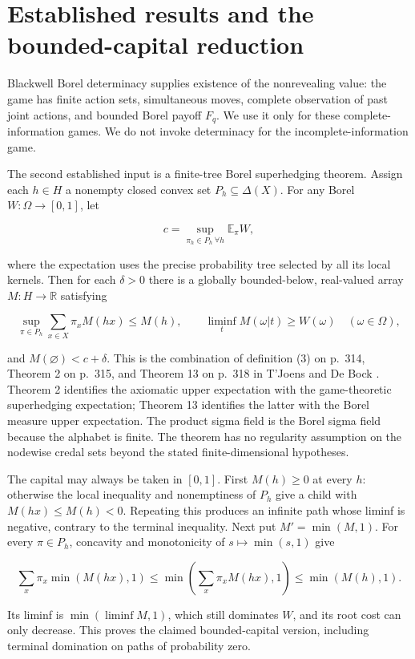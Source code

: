 \documentclass[11pt,a4paper]{article}
\begin{document}
\section{Established results and the bounded-capital reduction}

Blackwell Borel determinacy \cite[Theorem 10, p.~1578]{Martin} supplies existence of the nonrevealing value: the game has finite action sets, simultaneous moves, complete observation of past joint actions, and bounded Borel payoff \(F_q\). We use it only for these complete-information games. We do not invoke determinacy for the incomplete-information game.

The second established input is a finite-tree Borel superhedging theorem. Assign each \(h\in H\) a nonempty closed convex set \(P_h\subseteq\Delta(X)\). For any Borel \(W:\Omega\to[0,1]\), let

\[
c=\sup_{\pi_h\in P_h\ \forall h}\mathbb E_\pi W,
\]

where the expectation uses the precise probability tree selected by all its local kernels. Then for each \(\delta>0\) there is a globally bounded-below, real-valued array \(M:H\to\mathbb R\) satisfying

\[
\sup_{\pi\in P_h}\sum_{x\in X}\pi_x M(hx)\le M(h),\qquad
\liminf_tM(\omega|t)\ge W(\omega)\quad(\omega\in\Omega),
\]

and \(M(\varnothing)<c+\delta\). This is the combination of definition (3) on p.~314, Theorem 2 on p.~315, and Theorem 13 on p.~318 in T'Joens and De Bock \cite{TDB}. Theorem 2 identifies the axiomatic upper expectation with the game-theoretic superhedging expectation; Theorem 13 identifies the latter with the Borel measure upper expectation. The product sigma field is the Borel sigma field because the alphabet is finite. The theorem has no regularity assumption on the nodewise credal sets beyond the stated finite-dimensional hypotheses.

The capital may always be taken in \([0,1]\). First \(M(h)\ge0\) at every \(h\): otherwise the local inequality and nonemptiness of \(P_h\) give a child with \(M(hx)\le M(h)<0\). Repeating this produces an infinite path whose liminf is negative, contrary to the terminal inequality. Next put \(M'=\min(M,1)\). For every \(\pi\in P_h\), concavity and monotonicity of \(s\mapsto\min(s,1)\) give

\[
\sum_x\pi_x\min(M(hx),1)
\le\min\!\left(\sum_x\pi_xM(hx),1\right)
\le\min(M(h),1).
\]

Its liminf is \(\min(\liminf M,1)\), which still dominates \(W\), and its root cost can only decrease. This proves the claimed bounded-capital version, including terminal domination on paths of probability zero.
\end{document}
